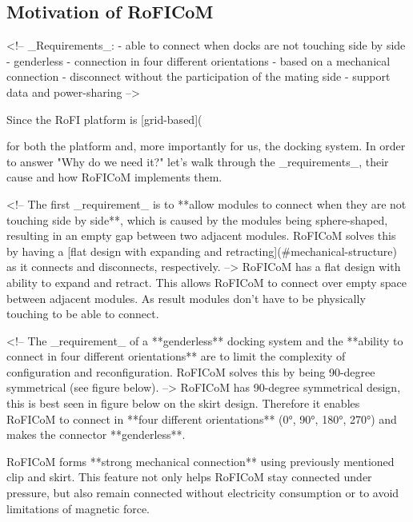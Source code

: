 \documentclass[
  digital,     %
  oneside,     %
  nosansbold,  %
  nocolorbold, %
  nolof,         %
  nolot,         %
]{fithesis4}
\begin{document}
\iffalse
\subsection{ Motivation of RoFICoM }
<!--
_Requirements_:
- able to connect when docks are not touching side by side
- genderless
- connection in four different orientations
- based on a mechanical connection
- disconnect without the participation of the mating side
- support data and power-sharing
-->

Since the RoFI platform is [grid-based]({%
for both the platform and, more importantly for us, the docking system.
In order to answer "Why do we need it?" let's walk through the _requirements_, their cause and how RoFICoM implements them.

<!-- The first _requirement_ is to **allow modules to connect
when they are not touching side by side**, which is caused by the modules being sphere-shaped, resulting in an empty gap between two adjacent modules. RoFICoM solves this by having a [flat design with expanding and retracting](#mechanical-structure) as it connects and disconnects, respectively. -->
RoFICoM has a flat design with ability to expand and retract. This allows RoFICoM to connect over empty space between
adjacent modules. As result modules don't have to be physically touching to be able to connect.

<!-- The _requirement_ of a **genderless** docking system and the **ability to connect in four different orientations** are to limit the
complexity of configuration and reconfiguration. RoFICoM solves this by being 90-degree symmetrical (see figure below). -->
RoFICoM has 90-degree symmetrical design, this is best seen in figure below on the skirt design. Therefore it enables
RoFICoM to connect in **four different orientations** (0°, 90°, 180°, 270°) and makes the connector **genderless**.

{%

RoFICoM forms **strong mechanical connection** using previously mentioned clip and skirt. This feature not only helps RoFICoM stay connected under pressure, but also remain connected without electricity consumption or to avoid limitations of magnetic force.

{%

}}}
\end{document}
